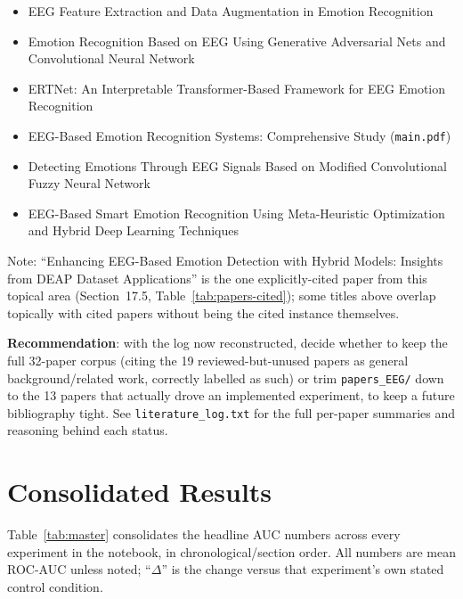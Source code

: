 \documentclass[11pt]{report}
\begin{document}
\begin{itemize}[itemsep=0pt]
        Learning
  \item EEG Feature Extraction and Data Augmentation in Emotion Recognition
  \item Emotion Recognition Based on EEG Using Generative Adversarial Nets
        and Convolutional Neural Network
  \item ERTNet: An Interpretable Transformer-Based Framework for EEG
        Emotion Recognition
  \item EEG-Based Emotion Recognition Systems: Comprehensive Study (\texttt{main.pdf})
  \item Detecting Emotions Through EEG Signals Based on Modified
        Convolutional Fuzzy Neural Network
  \item EEG-Based Smart Emotion Recognition Using Meta-Heuristic
        Optimization and Hybrid Deep Learning Techniques
\end{itemize}
Note: ``Enhancing EEG-Based Emotion Detection with Hybrid Models: Insights
from DEAP Dataset Applications'' is the one explicitly-cited paper from this
topical area (Section~17.5, Table~\ref{tab:papers-cited}); some titles above
overlap topically with cited papers without being the cited instance
themselves.

\textbf{Recommendation}: with the log now reconstructed, decide whether to
keep the full 32-paper corpus (citing the 19 reviewed-but-unused papers as
general background/related work, correctly labelled as such) or trim
\texttt{papers\_EEG/} down to the 13 papers that actually drove an
implemented experiment, to keep a future bibliography tight. See
\texttt{literature\_log.txt} for the full per-paper summaries and reasoning
behind each status.

\chapter{Consolidated Results}
\label{ch:results}

Table~\ref{tab:master} consolidates the headline AUC numbers across every
experiment in the notebook, in chronological/section order. All numbers are
mean ROC-AUC unless noted; ``$\Delta$'' is the change versus that
experiment's own stated control condition.
\end{document}
